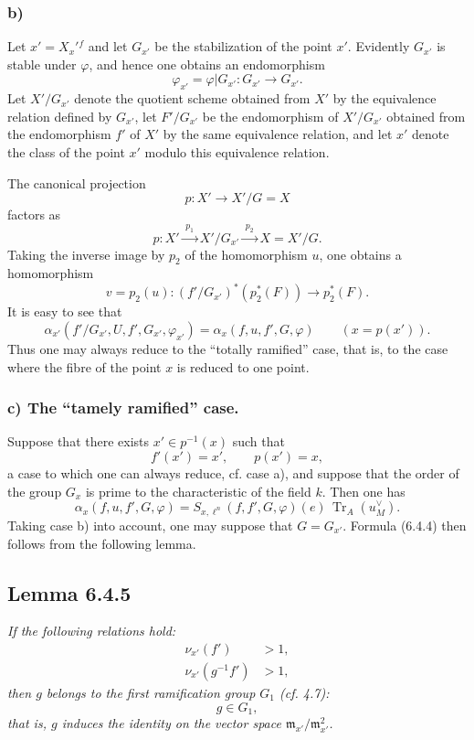 \documentclass[11pt]{article}
\providecommand{\fm}{\mathfrak{m}}
\providecommand{\Tr}{\operatorname{Tr}}
\providecommand{\Tr}{\operatorname{Tr}}
\providecommand{\Tr}{\operatorname{Tr}}
\providecommand{\Tr}{\operatorname{Tr}}
\providecommand{\fm}{\mathfrak m}
\providecommand{\Tr}{\operatorname{Tr}}
\begin{document}
\subsubsection*{b)} Let $x'= X_x'{}^{f}$ and let $G_{x'}$ be the stabilization of the point $x'$. Evidently $G_{x'}$ is stable under $\varphi$, and hence one obtains an endomorphism
\[
\varphi_{x'}=\varphi|G_{x'}:G_{x'}\longrightarrow G_{x'}.
\]
Let $X'/G_{x'}$ denote the quotient scheme obtained from $X'$ by the equivalence relation defined by $G_{x'}$, let $F'/G_{x'}$ be the endomorphism of $X'/G_{x'}$ obtained from the endomorphism $f'$ of $X'$ by the same equivalence relation, and let $x'$ denote the class of the point $x'$ modulo this equivalence relation.

The canonical projection
\[
p:X'\longrightarrow X'/G=X
\]
factors as
\[
p:X'\xrightarrow{\;p_1\;}X'/G_{x'}\xrightarrow{\;p_2\;}X=X'/G.
\]
Taking the inverse image by $p_2$ of the homomorphism $u$, one obtains a homomorphism
\[
v=p_2(u):(f'/G_{x'})^*(p_2^*(F))\longrightarrow p_2^*(F).
\]
It is easy to see that
\begin{equation}\tag{6.4.3}
\alpha_{x'}(f'/G_{x'},U,f',G_{x'},\varphi_{x'})
=
\alpha_x(f,u,f',G,\varphi)
\qquad (x=p(x')).
\end{equation}
Thus one may always reduce to the ``totally ramified'' case, that is, to the case where the fibre of the point $x$ is reduced to one point.

\subsubsection*{c) The ``tamely ramified'' case.} Suppose that there exists $x'\in p^{-1}(x)$ such that
\[
f'(x')=x',\qquad p(x')=x,
\]
a case to which one can always reduce, cf. case a), and suppose that the order of the group $G_{x}$ is prime to the characteristic of the field $k$. Then one has
\begin{equation}\tag{6.4.4}
\alpha_x(f,u,f',G,\varphi)=S_{x,\ell^n}(f,f',G,\varphi)(e)\,\Tr_A(u_M^\vee).
\end{equation}
Taking case b) into account, one may suppose that $G=G_{x'}$. Formula (6.4.4) then follows from the following lemma.

\subsection*{Lemma 6.4.5}
\emph{If the following relations hold:}
\begin{align*}
\nu_{x'}(f')&>1,\\
\nu_{x'}(g^{-1}f')&>1,
\end{align*}
\emph{then $g$ belongs to the first ramification group $G_1$ (cf. 4.7):}
\[
g\in G_1,
\]
\emph{that is, $g$ induces the identity on the vector space $\fm_{x'}/\fm_{x'}^2$.}
\end{document}
